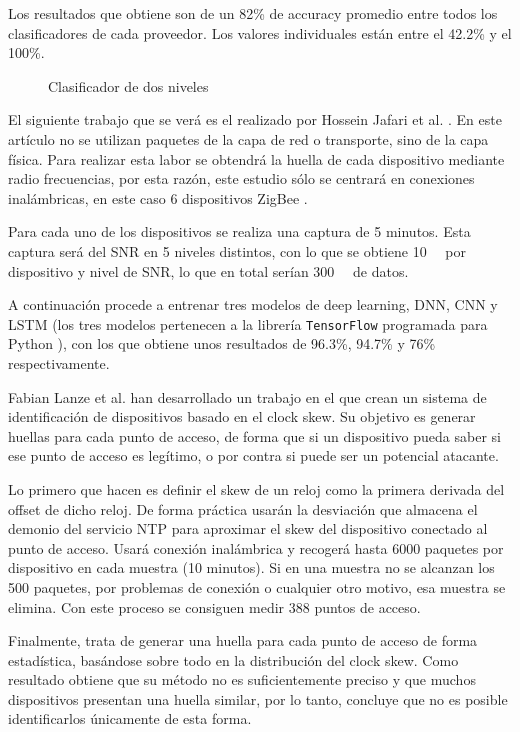 Los resultados que obtiene son de un 82\% de accuracy promedio entre todos los clasificadores de cada proveedor. Los valores individuales están entre el 42.2\% y el 100\%.

\begin{figure}
    \centering
    \resizebox{0.7\textwidth}{!}{
        
    }
    \caption{Clasificador de dos niveles \cite{aksoy2019automated}}
    \label{fig:askoy_classifier}
\end{figure}

El siguiente trabajo que se verá es el realizado por Hossein Jafari et al. \cite{jafari2018iot}. En este artículo no se utilizan paquetes de la capa de red o transporte, sino de la capa física. Para realizar esta labor se obtendrá la huella de cada dispositivo mediante radio frecuencias, por esta razón, este estudio sólo se centrará en conexiones inalámbricas, en este caso 6 dispositivos ZigBee \cite{gislason2008zigbee}.

Para cada uno de los dispositivos se realiza una captura de 5 minutos. Esta captura será del SNR en 5 niveles distintos, con lo que se obtiene \SI{10}{\giga\byte} por dispositivo y nivel de SNR, lo que en total serían \SI{300}{\giga\byte} de datos.

A continuación procede a entrenar tres modelos de deep learning, DNN, CNN y LSTM (los tres modelos pertenecen a la librería \texttt{TensorFlow} programada para Python \cite{tensorflow2015-whitepaper}), con los que obtiene unos resultados de 96.3\%, 94.7\% y 76\% respectivamente.

Fabian Lanze et al. \cite{lanze2012clock} han desarrollado un trabajo en el que crean un sistema de identificación de dispositivos basado en el clock skew. Su objetivo es generar huellas para cada punto de acceso, de forma que si un dispositivo pueda saber si ese punto de acceso es legítimo, o por contra si puede ser un potencial atacante.

Lo primero que hacen es definir el skew de un reloj como la primera derivada del offset de dicho reloj. De forma práctica usarán la desviación que almacena el demonio del servicio NTP para aproximar el skew del dispositivo conectado al punto de acceso. Usará conexión inalámbrica y recogerá hasta 6000 paquetes por dispositivo en cada muestra (10 minutos). Si en una muestra no se alcanzan los 500 paquetes, por problemas de conexión o cualquier otro motivo, esa muestra se elimina. Con este proceso se consiguen medir 388 puntos de acceso. 

Finalmente, trata de generar una huella para cada punto de acceso de forma estadística, basándose sobre todo en la distribución del clock skew. Como resultado obtiene que su método no es suficientemente preciso y que muchos dispositivos presentan una huella similar, por lo tanto, concluye que no es posible identificarlos únicamente de esta forma.


